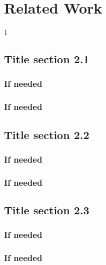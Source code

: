 \doublespacing %

\chapter{Related Work}
\label{ch2}

\begin{spacing}{1} %
\minitoc %
\end{spacing} %
\thesisspacing %


\kant[1]

\section{Title section 2.1}

\kant[1-2]

\subsection{If needed}

\kant[1]

\subsection{If needed}

\kant[1]

\section{Title section 2.2}

\kant[1-2]

\subsection{If needed}

\kant[1]

\subsection{If needed}

\kant[1]

\section{Title section 2.3}

\kant[1-2]

\subsection{If needed}

\kant[1]

\subsection{If needed}

\kant[1]